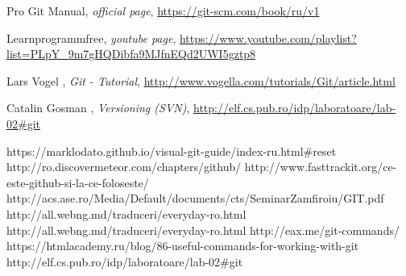 \begin{thebibliography}{99999}
\singlespace\normalsize

 Pro Git Manual, \textit{ official page}, \url{https://git-scm.com/book/ru/v1}

 Learnprogrammfree, \textit{youtube page}, \url{https://www.youtube.com/playlist?list=PLpY_9m7gHQDibfa9MJfnEQd2UWI5gztp8}

 Lars Vogel , \textit{Git - Tutorial}, \url{http://www.vogella.com/tutorials/Git/article.html}

 Catalin Gosman , \textit{Versioning (SVN)}, \url{http://elf.cs.pub.ro/idp/laboratoare/lab-02#git}


https://marklodato.github.io/visual-git-guide/index-ru.html#reset
http://ro.discovermeteor.com/chapters/github/
http://www.fasttrackit.org/ce-este-github-si-la-ce-foloseste/
http://acs.ase.ro/Media/Default/documents/cts/SeminarZamfiroiu/GIT.pdf
http://all.webng.md/traduceri/everyday-ro.html
http://all.webng.md/traduceri/everyday-ro.html
http://eax.me/git-commands/
https://htmlacademy.ru/blog/86-useful-commands-for-working-with-git
http://elf.cs.pub.ro/idp/laboratoare/lab-02#git

\end{thebibliography}
